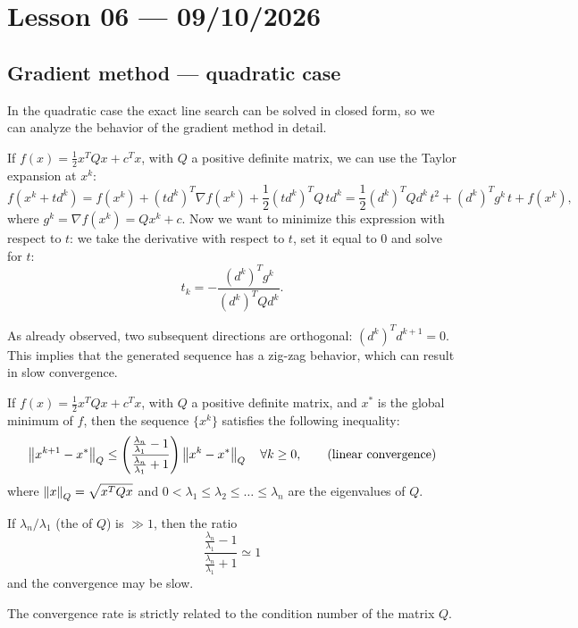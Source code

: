 \section{Lesson 06 --- 09/10/2026}

\subsection{Gradient method --- quadratic case}

In the quadratic case the exact line search can be solved in closed form, so we can analyze the behavior of the gradient method in detail.

If $f(x) = \frac{1}{2}x^TQx + c^Tx$, with $Q$ a positive definite matrix, we can use the Taylor expansion at $x^k$:
\[
    f(x^k+td^k) = f(x^k) + (td^k)^T\nabla f(x^k) + \frac{1}{2}(td^k)^TQ\,td^k
    = \frac{1}{2}(d^k)^TQd^k\,t^2 + (d^k)^Tg^k\,t + f(x^k),
\]
where $g^k = \nabla f(x^k) = Qx^k + c$.
Now we want to minimize this expression with respect to $t$: we take the derivative with respect to $t$, set it equal to $0$ and solve for $t$:
\[
    t_k = -\frac{(d^k)^Tg^k}{(d^k)^TQd^k}.
\]

As already observed, two subsequent directions are orthogonal: $(d^k)^Td^{k+1} = 0$. This implies that the generated sequence has a zig-zag behavior, which can result in slow convergence.

\begin{theorem}
    If $f(x) = \frac{1}{2}x^TQx + c^Tx$, with $Q$ a positive definite matrix, and $x^*$ is the global minimum of $f$, then the sequence $\{x^k\}$ satisfies the following inequality:
    \[
        \left\lVert x^{k+1}-x^* \right\rVert_Q \le \left(\frac{\frac{\lambda_n}{\lambda_1}-1}{\frac{\lambda_n}{\lambda_1}+1}\right)\left\lVert x^k-x^* \right\rVert_Q \quad \forall k \ge 0, \qquad \text{(linear convergence)}
    \]
    where $\left\lVert x \right\rVert_Q = \sqrt{x^TQx}$ and $0 < \lambda_1 \le \lambda_2 \le \dots \le \lambda_n$ are the eigenvalues of $Q$.
\end{theorem}

\begin{remark}
    If $\lambda_n/\lambda_1$ (the  of $Q$) is $\gg 1$, then the ratio
    \[
        \frac{\frac{\lambda_n}{\lambda_1}-1}{\frac{\lambda_n}{\lambda_1}+1} \simeq 1
    \]
    and the convergence may be slow.
\end{remark}

The convergence rate is strictly related to the condition number of the matrix $Q$.

